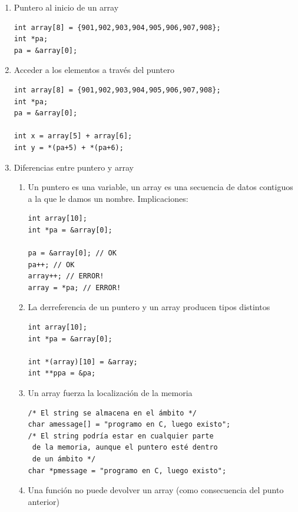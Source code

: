 \documentclass[a4paper,oneside]{article}
\begin{document}
  \begin{enumerate}
  \item Puntero al inicio de un array

    \begin{verbatim}
int array[8] = {901,902,903,904,905,906,907,908};
int *pa;
pa = &array[0];
    \end{verbatim}

  \item Acceder a los elementos a través del puntero

    \begin{verbatim}
int array[8] = {901,902,903,904,905,906,907,908};
int *pa;
pa = &array[0];

int x = array[5] + array[6];
int y = *(pa+5) + *(pa+6);
    \end{verbatim}

  \item Diferencias entre puntero y array
    \begin{enumerate}
    \item Un puntero es una variable, un array es una secuencia de datos contiguos a la que le damos un nombre. Implicaciones:

      \begin{verbatim}
int array[10];
int *pa = &array[0];

pa = &array[0]; // OK
pa++; // OK
array++; // ERROR!
array = *pa; // ERROR!
      \end{verbatim}

    \item La derreferencia de un puntero y un array producen tipos distintos

      \begin{verbatim}
int array[10];
int *pa = &array[0];

int *(array)[10] = &array;
int **ppa = &pa;
      \end{verbatim}

    \item Un array fuerza la localización de la memoria

      \begin{verbatim}
/* El string se almacena en el ámbito */
char amessage[] = "programo en C, luego existo";
/* El string podría estar en cualquier parte
 de la memoria, aunque el puntero esté dentro
 de un ámbito */
char *pmessage = "programo en C, luego existo";

      \end{verbatim}
    \item Una función no puede devolver un array (como consecuencia del punto anterior)
    \end{enumerate}

  \end{enumerate}
\end{document}
